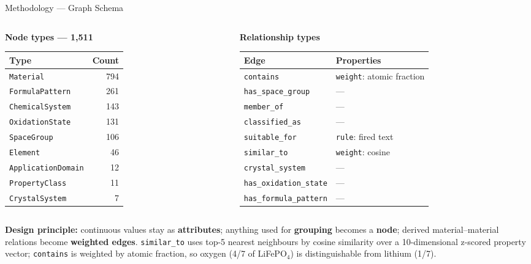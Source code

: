 \documentclass{beamer}
\begin{document}
\begin{frame}{Methodology --- Graph Schema}
\begin{columns}[T]
\begin{column}{0.46\textwidth}
\centering \textbf{Node types --- 1,511}\\[0.15cm]
\scriptsize
\begin{tabular}{lr}
\toprule
\textbf{Type} & \textbf{Count} \\
\midrule
\texttt{Material} & 794 \\
\texttt{FormulaPattern} & 261 \\
\texttt{ChemicalSystem} & 143 \\
\texttt{OxidationState} & 131 \\
\texttt{SpaceGroup} & 106 \\
\texttt{Element} & 46 \\
\texttt{ApplicationDomain} & 12 \\
\texttt{PropertyClass} & 11 \\
\texttt{CrystalSystem} & 7 \\
\bottomrule
\end{tabular}
\end{column}

\begin{column}{0.52\textwidth}
\centering \textbf{Relationship types}\\[0.15cm]
\scriptsize
\begin{tabular}{ll}
\toprule
\textbf{Edge} & \textbf{Properties} \\
\midrule
\texttt{contains} & \texttt{weight}: atomic fraction \\
\texttt{has\_space\_group} & --- \\
\texttt{member\_of} & --- \\
\texttt{classified\_as} & --- \\
\texttt{suitable\_for} & \texttt{rule}: fired text \\
\texttt{similar\_to} & \texttt{weight}: cosine \\
\texttt{crystal\_system} & --- \\
\texttt{has\_oxidation\_state} & --- \\
\texttt{has\_formula\_pattern} & --- \\
\bottomrule
\end{tabular}
\end{column}
\end{columns}

\vspace{0.25cm}
\footnotesize
\textbf{Design principle:} continuous values stay as \textbf{attributes}; anything used for \textbf{grouping} becomes a \textbf{node}; derived material--material relations become \textbf{weighted edges}. \texttt{similar\_to} uses top-5 nearest neighbours by cosine similarity over a 10-dimensional z-scored property vector; \texttt{contains} is weighted by atomic fraction, so oxygen (4/7 of LiFePO$_4$) is distinguishable from lithium (1/7).
\end{frame}
\end{document}
